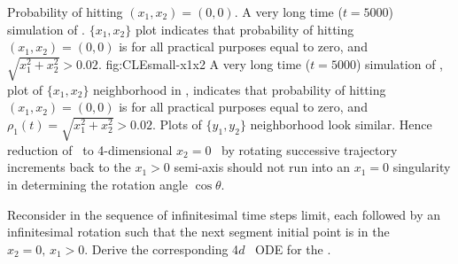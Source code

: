 {Probability of hitting $(x_1,x_2) =(0,0)$.}{
%
{}{
A very long time ($t=5000$) simulation of \cLf. $\{x_1,x_2\}$ plot indicates
that probability of hitting $(x_1,x_2) =(0,0)$ is for all practical purposes
equal to zero, and $\sqrt{x_1^2+x_2^2} > 0.02$.
}
{fig:CLEsmall-x1x2}
%
A very long time ($t=5000$) simulation of \cLf, plot of
$\{x_1,x_2\}$  neighborhood in ,
indicates that probability of hitting $(x_1,x_2) =(0,0)$ is
for all practical purposes equal to zero, and
$\rho_1(t)=\sqrt{x_1^2+x_2^2} > 0.02$. Plots of $\{y_1,y_2\}$
neighborhood look similar.
Hence reduction of \statesp\ to 4-dimensional $x_2=0$ \reducedsp\ by rotating successive trajectory increments back
to the $x_1>0$ semi-axis should not run into an $x_1 =0$
singularity in determining the rotation angle $\cos\theta$.
    } %


{\label{exer:csectionCLeODE}
Reconsider  in the sequence of
infinitesimal time steps limit, each followed by an
infinitesimal rotation such that the next segment initial
point is in the {\slice} $x_2=0,\,x_1>0$. Derive the
corresponding 4$d$ \reducedsp\ ODE for the \cLf.
    } %

